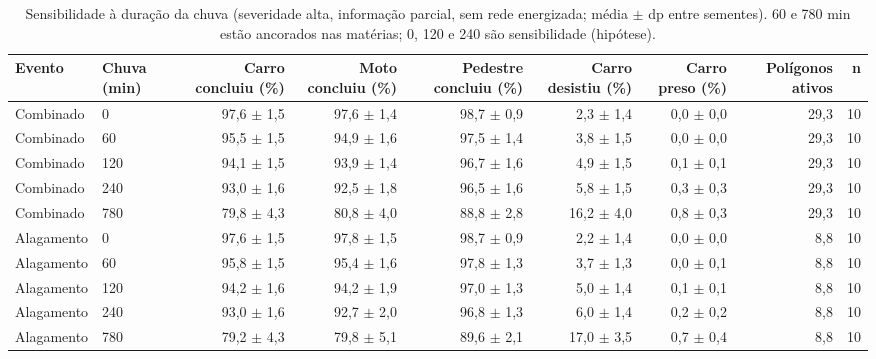 \begin{table}[htbp]
\centering
\scriptsize
\caption{Sensibilidade à duração da chuva (severidade alta, informação parcial, sem rede energizada; média $\pm$ dp entre sementes). 60 e 780 min estão ancorados nas matérias; 0, 120 e 240 são sensibilidade (hipótese).}
\label{tab:t3}
\begin{tabular}{llrrrrrrr}
\toprule
Evento & Chuva (min) & Carro concluiu (\%) & Moto concluiu (\%) & Pedestre concluiu (\%) & Carro desistiu (\%) & Carro preso (\%) & Polígonos ativos & n \\
\midrule
Combinado & 0 & 97,6 $\pm$ 1,5 & 97,6 $\pm$ 1,4 & 98,7 $\pm$ 0,9 & 2,3 $\pm$ 1,4 & 0,0 $\pm$ 0,0 & 29,3 & 10 \\
Combinado & 60 & 95,5 $\pm$ 1,5 & 94,9 $\pm$ 1,6 & 97,5 $\pm$ 1,4 & 3,8 $\pm$ 1,5 & 0,0 $\pm$ 0,0 & 29,3 & 10 \\
Combinado & 120 & 94,1 $\pm$ 1,5 & 93,9 $\pm$ 1,4 & 96,7 $\pm$ 1,6 & 4,9 $\pm$ 1,5 & 0,1 $\pm$ 0,1 & 29,3 & 10 \\
Combinado & 240 & 93,0 $\pm$ 1,6 & 92,5 $\pm$ 1,8 & 96,5 $\pm$ 1,6 & 5,8 $\pm$ 1,5 & 0,3 $\pm$ 0,3 & 29,3 & 10 \\
Combinado & 780 & 79,8 $\pm$ 4,3 & 80,8 $\pm$ 4,0 & 88,8 $\pm$ 2,8 & 16,2 $\pm$ 4,0 & 0,8 $\pm$ 0,3 & 29,3 & 10 \\
Alagamento & 0 & 97,6 $\pm$ 1,5 & 97,8 $\pm$ 1,5 & 98,7 $\pm$ 0,9 & 2,2 $\pm$ 1,4 & 0,0 $\pm$ 0,0 & 8,8 & 10 \\
Alagamento & 60 & 95,8 $\pm$ 1,5 & 95,4 $\pm$ 1,6 & 97,8 $\pm$ 1,3 & 3,7 $\pm$ 1,3 & 0,0 $\pm$ 0,1 & 8,8 & 10 \\
Alagamento & 120 & 94,2 $\pm$ 1,6 & 94,2 $\pm$ 1,9 & 97,0 $\pm$ 1,3 & 5,0 $\pm$ 1,4 & 0,1 $\pm$ 0,1 & 8,8 & 10 \\
Alagamento & 240 & 93,0 $\pm$ 1,6 & 92,7 $\pm$ 2,0 & 96,8 $\pm$ 1,3 & 6,0 $\pm$ 1,4 & 0,2 $\pm$ 0,2 & 8,8 & 10 \\
Alagamento & 780 & 79,2 $\pm$ 4,3 & 79,8 $\pm$ 5,1 & 89,6 $\pm$ 2,1 & 17,0 $\pm$ 3,5 & 0,7 $\pm$ 0,4 & 8,8 & 10 \\
\bottomrule
\end{tabular}
\end{table}
